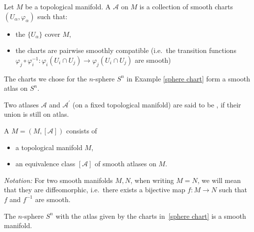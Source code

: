 \documentclass[a4paper,11pt]{article}
\begin{document}

\begin{definition}
    Let \(M\) be a topological manifold. A  \(\mathcal{A}\) on \(M\) is a collection of smooth charts \((U_\alpha,\varphi_\alpha)\) such that:
    \begin{itemize}
        \item the \(\{U_\alpha\}\) cover \(M\),
        \item the charts are pairwise smoothly compatible (i.e.\ the transition functions \(\varphi_j \circ \varphi_i^{-1}:\varphi_i(U_i\cap U_j)\to\varphi_j(U_i\cap U_j)\) are smooth)
    \end{itemize}
\end{definition}

\begin{example}
    The charts we chose for the \(n\)-sphere \(S^n\) in Example \ref{sphere chart} form a smooth atlas on \(S^n\).
\end{example}

\begin{definition}
    Two atlases \(\mathcal{A}\) and \(\mathcal{A}^\prime\) (on a fixed topological manifold) are said to be , if their union is still on atlas.
\end{definition}


\begin{definition}
    A  \(M=(M,[\mathcal{A}])\) consists of
    \begin{itemize}
        \item a topological manifold \(M\),
        \item an equivalence class \([\mathcal{A}]\) of smooth atlases on \(M\).
    \end{itemize}
\end{definition}

\noindent\textit{Notation:}
    For two smooth manifolds \(M,N\), when writing \(M=N\), we will mean that they are diffeomorphic, i.e.\ there exists a bijective map \(f:M\to N\) such that \(f\) and \(f^{-1}\) are smooth.


\begin{example}[Spheres]
    The \(n\)-sphere \(S^n\) with the atlas given by the charts in\ \ref{sphere chart} is a smooth manifold.
\end{example}
\end{document}
